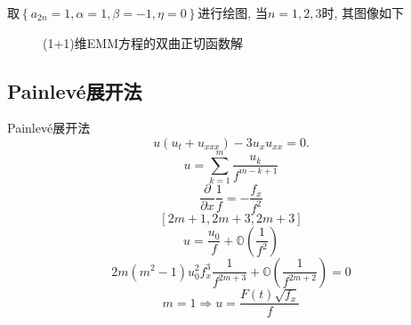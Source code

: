 \documentclass{beamer}
\newcommand{\mbrace}[1]{\left[#1\right]}
\newcommand{\bbrace}[1]{\left\{#1\right\}}
\newcommand{\OO}{\ensuremath{\mathbb O}}%
\newcommand{\DIF}[1]{\ensuremath{\frac{\partial}{\partial #1}}}
\newcommand{\Painleve}{Painlev{\'e}}
\begin{document}
\begin{frame}
取$\bbrace{a_{2n}=1,\alpha=1,\beta=-1,\eta=0}$进行绘图, 当$n=1,2,3$时, 其图像如下
\begin{figure}[ht]
\centering
{}
\caption{(1+1)维EMM方程的双曲正切函数解} 
\end{figure}
\end{frame}

\subsection{\Painleve{}展开法}
\begin{frame}{\Painleve{}展开法}
\[
  u(u_t+u_{xxx})-3u_x u_{xx}=0.
\]
\[
  u=\sum_{k=1}^{m}\frac{u_k}{f^{m-k+1}}
\]
\[
  \DIF{x}{\frac{1}{f}}=-\frac{f_x}{f^2}
\]
\[
  \mbrace{2m+1,2m+3,2m+3}
\]
\[
  u=\frac{u_0}{f}+\OO(\frac{1}{f^2})
\]
\[
  2m(m^2-1)u_0^2f_x^3\frac{1}{f^{2m+3}}+\OO(\frac{1}{f^{2m+2}})=0
\]
\[
  m=1\Rightarrow u=\frac{F(t)\sqrt{f_x}}{f}
\]
\end{frame}
\end{document}
